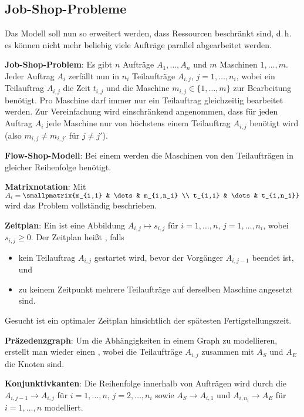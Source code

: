 \pagebreak

\subsection{%
    Job-Shop-Probleme%
}

Das Modell soll nun so erweitert werden, dass Ressourcen beschränkt sind,
d.\,h. es können nicht mehr beliebig viele Aufträge parallel abgearbeitet werden.

\textbf{Job-Shop-Problem}:
Es gibt $n$ Aufträge $A_1, \dotsc, A_n$
und $m$ Maschinen $1, \dotsc, m$.
Jeder Auftrag $A_i$ zerfällt nun in $n_i$ Teilaufträge $A_{i,j}$, $j = 1, \dotsc, n_i$,
wobei ein Teilauftrag $A_{i,j}$ die Zeit $t_{i,j}$ und
die Maschine $m_{i,j} \in \{1, \dotsc, m\}$ zur Bearbeitung benötigt.
Pro Maschine darf immer nur ein Teilauftrag gleichzeitig bearbeitet werden.
Zur Vereinfachung wird einschränkend angenommen, dass für jeden Auftrag $A_i$
jede Maschine nur von höchstens einem Teilauftrag $A_{i,j}$ benötigt wird
(also $m_{i,j} \not= m_{i,j'}$ für $j \not= j'$).

\textbf{Flow-Shop-Modell}:
Bei einem  werden die Maschinen von den Teilaufträgen in gleicher
Reihenfolge benötigt.

\textbf{Matrixnotation}:
Mit $A_i = \smallpmatrix{m_{i,1} & \dots & m_{i,n_i} \\ t_{i,1} & \dots & t_{i,n_i}}$
wird das Problem vollständig beschrieben.

\textbf{Zeitplan}:
Ein  ist eine Abbildung $A_{i,j} \mapsto s_{i,j}$ für
$i = 1, \dotsc, n$, $j = 1, \dotsc, n_i$, wobei $s_{i,j} \ge 0$.
Der Zeitplan heißt , falls
\begin{itemize}
    \item
    kein Teilauftrag $A_{i,j}$ gestartet wird, bevor der Vorgänger $A_{i,j-1}$ beendet ist, und
    
    \item
    zu keinem Zeitpunkt mehrere Teilaufträge auf derselben Maschine angesetzt sind.
\end{itemize}
Gesucht ist ein optimaler Zeitplan hinsichtlich der spätesten Fertigstellungszeit.

\linie

\textbf{Präzedenzgraph}:
Um die Abhängigkeiten in einem Graph zu modellieren, erstellt man wieder einen
, wobei die Teilaufträge $A_{i,j}$ zusammen mit $A_S$ und $A_E$
die Knoten sind.

\textbf{Konjunktivkanten}:
Die Reihenfolge innerhalb von Aufträgen wird durch die 
$A_{i,j-1} \to A_{i,j}$ für $i = 1, \dotsc, n$, $j = 2, \dotsc, n_i$
sowie $A_S \to A_{i,1}$ und $A_{i,n_i} \to A_E$ für $i = 1, \dotsc, n$ modelliert.

